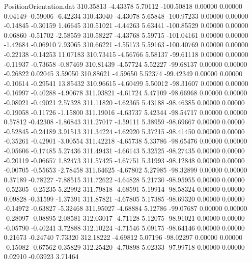 \begin{filecontents}{PositionOrientation.dat}
 310.35813   -4.43378    5.70112  -100.50818    0.00000    0.00000    0.04149   -0.59006   -6.42234
 310.43040   -4.43078    5.65848  -100.97233    0.00000    0.00000   -0.14845   -0.30159    1.46645
 310.51021   -4.44263    5.63441  -100.85529    0.00000    0.00000    0.06860   -0.51702   -2.58559
 310.58227   -4.43768    5.59715  -101.04161    0.00000    0.00000   -1.42684   -0.06910    7.93065
 310.66221   -4.55173    5.59163  -100.40769    0.00000    0.00000   -0.22138   -0.14253   11.07183
 310.73415   -4.56766    5.58137   -99.61118    0.00000    0.00000   -0.11937   -0.73658   -0.87469
 310.81439   -4.57724    5.52227   -99.68137    0.00000    0.00000   -0.26822    0.02045    3.59050
 310.88621   -4.59650    5.52374   -99.42349    0.00000    0.00000   -0.10614   -0.29541   13.85432
 310.96615   -4.60499    5.50012   -98.31607    0.00000    0.00000   -0.16997   -0.40288   -4.90678
 311.03821   -4.61724    5.47109   -98.66968    0.00000    0.00000   -0.08021   -0.49021    2.57328
 311.11820   -4.62365    5.43188   -98.46385    0.00000    0.00000   -0.19058   -0.11726   -1.15800
 311.19016   -4.63737    5.42344   -98.54717    0.00000    0.00000    0.57812   -0.42308   -1.86843
 311.27017   -4.59111    5.38959   -98.69667    0.00000    0.00000   -0.52845   -0.24189    3.91513
 311.34224   -4.62920    5.37215   -98.41450    0.00000    0.00000   -0.35261   -0.42901   -3.00554
 311.42218   -4.65738    5.33786   -98.65476    0.00000    0.00000   -0.05606   -0.17485    5.27436
 311.49431   -4.66143    5.32525   -98.27435    0.00000    0.00000   -0.20119   -0.06657    1.82473
 311.57425   -4.67751    5.31993   -98.12848    0.00000    0.00000   -0.00705   -0.55653   -2.78458
 311.64625   -4.67802    5.27985   -98.32899    0.00000    0.00000    0.37189   -0.78227   -7.88515
 311.72622   -4.64828    5.21730   -98.95955    0.00000    0.00000   -0.52305   -0.25235    5.22992
 311.79818   -4.68591    5.19914   -98.58324    0.00000    0.00000    0.09828   -0.31599   -1.37391
 311.87821   -4.67805    5.17385   -98.69320    0.00000    0.00000   -0.14972   -0.63827   -5.32468
 311.95027   -4.68884    5.12786   -99.07687    0.00000    0.00000   -0.28097   -0.08895    2.08581
 312.03017   -4.71128    5.12075   -98.91021    0.00000    0.00000   -0.05790   -0.40241    3.72888
 312.10224   -4.71546    5.09175   -98.64146    0.00000    0.00000    0.21673   -0.24740    7.73320
 312.18222   -4.69812    5.07196   -98.02297    0.00000    0.00000   -0.15082   -0.67562    0.35829
 312.25420   -4.70898    5.02333   -97.99718    0.00000    0.00000    0.02910   -0.03923    3.71464

\end{filecontents}
